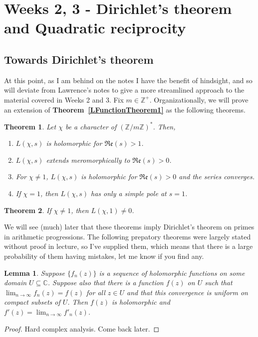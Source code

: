 \documentclass[12pt]{article}
\newcommand{\ints}{\mathbb{Z}}
\newcommand{\complex}{\mathbb{C}}
\newcommand{\intsmod}[1]{\ints / #1 \ints}
\newcommand{\tref}[1]{\textbf{Theorem~\ref{#1}}}
\newtheorem{thm}{Theorem}
\newtheorem{lemma}{Lemma}
\numberwithin{equation}{section}
\numberwithin{thm}{section}
\numberwithin{lemma}{section}
\numberwithin{cor}{section}
\begin{document}
\section{Weeks 2, 3 - Dirichlet's theorem and Quadratic reciprocity}

\subsection{Towards Dirichlet's theorem}

At this point, as I am behind on the notes I have the benefit of hindsight, and so will deviate from Lawrence's notes to give a more streamlined approach to the material covered in Weeks 2 and 3. Fix $m \in \ints^+$. Organizationally, we will prove an extension of \tref{LFunctionTheorem1} as the following theorems.

\begin{thm}\label{LFunctionSubTheorems1}
  Let $\chi$ be a character of $(\intsmod{m})^*$. Then, \begin{enumerate}
    \item $L(\chi, s)$ is holomorphic for $\mathfrak{Re}(s) > 1$.
    \item $L(\chi, s)$ extends meromorphically to $\mathfrak{Re}(s) > 0$.
    \item For $\chi \ne 1$, $L(\chi, s)$ is holomorphic for $\mathfrak{Re}(s) > 0$ and the series converges.
    \item If $\chi = 1$, then $L(\chi, s)$ has only a simple pole at $s=1$.
  \end{enumerate}
\end{thm}

\begin{thm}\label{LFunctionDoesntVanish}
  If $\chi \ne 1$, then $L(\chi, 1) \ne 0$.
\end{thm}

We will see (much) later that these theorems imply Dirichlet's theorem on primes in arithmetic progressions. The following prepatory theorems were largely stated without proof in lecture, so I've supplied them, which means that there is a large probability of them having mistakes, let me know if you find any.

\begin{lemma}\label{ConvergenceOnCompactImpliesConvergenceEverywhere}
  Suppose $\{f_n(z) \}$ is a sequence of holomorphic functions on some domain $U \subseteq \complex$. Suppose also that there is a function $f(z)$ on $U$ such that $\lim_{n \to \infty} f_n(z) = f(z)$ for all $z \in U$ and that this convergence is uniform on compact subsets of $U$. Then $f(z)$ is holomorphic and $f'(z) = \lim_{n \to \infty} f'_n(z)$. 
\end{lemma}
\begin{proof}
  Hard complex analysis. Come back later.
\end{proof}
\end{document}
